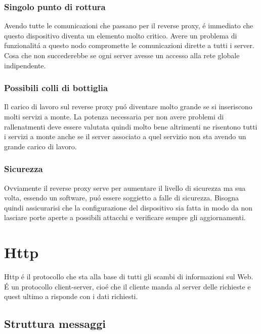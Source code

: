 \subsubsection{Singolo punto di rottura}
Avendo tutte le comunicazioni che passano per il reverse proxy, é immediato che questo dispositivo diventa un elemento molto critico. Avere un problema di funzionalitá a questo nodo compromette le comunicazioni dirette a tutti i server. Cosa che non succederebbe se ogni server avesse un accesso alla rete globale indipendente.
\subsubsection{Possibili colli di bottiglia}
Il carico di lavoro sul reverse proxy puó diventare molto grande se si inseriscono molti servizi a monte. La potenza necessaria per non avere problemi di rallenatmenti deve essere valutata quindi molto bene altrimenti ne risentono tutti i servizi a monte anche se il server associato a quel servizio non sta avendo un grande carico di lavoro.
\subsubsection{Sicurezza}
Ovviamente il reverse proxy serve per aumentare il livello di sicurezza ma sua volta, essendo un software, puó essere soggietto a falle di sicurezza. Bisogna quindi assicurarisi che la configurazione del dispositivo sia fatta in modo da non lasciare porte aperte a possibili attacchi e verificare sempre gli aggiornamenti.


\section{Http}
\cite{http}
Http é il protocollo che sta alla base di tutti gli scambi di informazioni sul Web. É un protocollo client-server, cioé che il cliente manda al server delle richieste e quest ultimo a risponde con i dati richiesti.
\subsection{Struttura messaggi}
